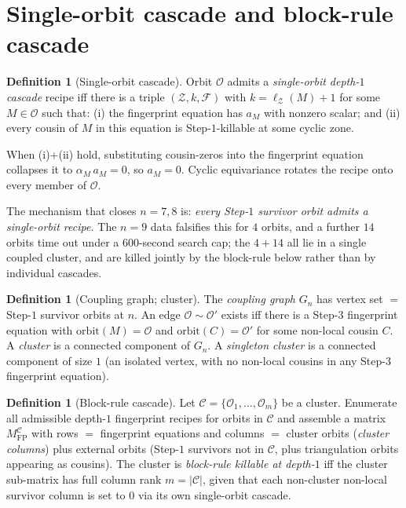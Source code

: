 \documentclass[11pt]{article}
\theoremstyle{definition}
\newtheorem{defn}[thm]{Definition}
\begin{document}
\section{Single-orbit cascade and block-rule cascade}\label{sec:cascades}

\begin{defn}[Single-orbit cascade]\label{def:single}
Orbit $\mathcal O$ admits a \emph{single-orbit depth-$1$ cascade}
recipe iff there is a triple $(\mathcal Z, k, \mathcal F)$ with
$k=\ell_{\mathcal Z}(M)+1$ for some $M\in\mathcal O$ such that:
(i) the fingerprint equation has $a_M$ with nonzero scalar; and
(ii) every cousin of $M$ in this equation is Step-$1$-killable at
some cyclic zone.
\end{defn}

When (i)+(ii) hold, substituting cousin-zeros into the fingerprint
equation collapses it to $\alpha_M\,a_M=0$, so $a_M=0$. Cyclic
equivariance rotates the recipe onto every member of $\mathcal O$.

The mechanism that closes $n=7,8$ is: \emph{every Step-$1$ survivor
orbit admits a single-orbit recipe.} The $n=9$ data falsifies this
for $4$ orbits, and a further $14$ orbits time out under a
$600$-second search cap; the $4+14$ all lie in a single coupled
cluster, and are killed jointly by the block-rule below rather than
by individual cascades.

\begin{defn}[Coupling graph; cluster]\label{def:coupling}
The \emph{coupling graph} $G_n$ has vertex set $=$ Step-$1$ survivor
orbits at $n$. An edge $\mathcal O \sim \mathcal O'$ exists iff
there is a Step-$3$ fingerprint equation with $\mathrm{orbit}(M)
=\mathcal O$ and $\mathrm{orbit}(C)=\mathcal O'$ for some non-local
cousin $C$. A \emph{cluster} is a connected component of $G_n$.
A \emph{singleton cluster} is a connected component of size $1$
(an isolated vertex, with no non-local cousins in any Step-$3$
fingerprint equation).
\end{defn}

\begin{defn}[Block-rule cascade]\label{def:block-rule}
Let $\mathcal C=\{\mathcal O_1,\dots,\mathcal O_m\}$ be a cluster.
Enumerate all admissible depth-$1$ fingerprint recipes for orbits in
$\mathcal C$ and assemble a matrix $M_{\mathrm{FP}}^{\mathcal C}$
with rows $=$ fingerprint equations and columns $=$ cluster orbits
(\emph{cluster columns}) plus external orbits (Step-$1$ survivors
not in $\mathcal C$, plus triangulation orbits appearing as cousins).
The cluster is \emph{block-rule killable at depth-$1$} iff the
cluster sub-matrix has full column rank $m=|\mathcal C|$, given
that each non-cluster non-local survivor column is set to $0$ via
its own single-orbit cascade.
\end{defn}
\end{document}
